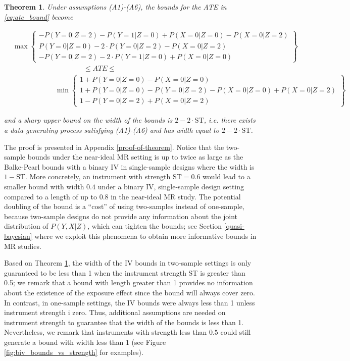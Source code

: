 \documentclass[
]{article}
\theoremstyle{plain}
\newtheorem{theorem}{Theorem}[section]
\begin{document}
\begin{theorem}\label{thm:upperBoundWidth}
Under assumptions (A1)-(A6), the bounds for the ATE in \eqref{eq:ate_bound} become

\[
  \begin{aligned}
    &\max
      \begin{Bmatrix}
        -P(Y = 0 | Z = 2) - P(Y = 1 | Z = 0) + P(X = 0 | Z = 0) - P(X = 0 | Z = 2) \\
        P(Y = 0 | Z = 0) - 2\cdot P(Y = 0 | Z = 2) - P(X = 0 | Z = 2) \\
        -P(Y = 0 | Z = 2) - 2\cdot P(Y = 1 | Z = 0) + P(X = 0 | Z = 0)
      \end{Bmatrix} \\
    &\qquad \qquad \qquad \qquad \qquad\le ATE \le \\
    &\qquad \qquad \qquad \min
      \begin{Bmatrix}
        1 + P(Y = 0 | Z = 0) - P(X = 0 | Z = 0) \\
        1 + P(Y = 0 | Z = 0) - P(Y = 0 | Z = 2) - P(X = 0 | Z = 0) + P(X = 0 | Z = 2) \\
        1 - P(Y = 0 | Z = 2) +  P(X = 0 | Z = 2)
      \end{Bmatrix}
  \end{aligned}
\]

and a sharp upper bound on the width of the bounds is $2 - 2\cdot \text{ST}$, i.e. there exists a data generating process satisfying (A1)-(A6) and has width equal to $2 - 2\cdot \text{ST}$.

\end{theorem}

The proof is presented in Appendix \ref{proof-of-theorem}. Notice that the two-sample bounds under the near-ideal MR setting is up to twice as large as the Balke-Pearl bounds with a binary IV in single-sample designs where the width is \(1-\text{ST}\). More concretely, an instrument with strength \(\text{ST} = 0.6\) would lead to a smaller bound with width \(0.4\) under a binary IV, single-sample design setting compared to a length of up to \(0.8\) in the near-ideal MR study. The potential doubling of the bound is a ``cost'' of using two-samples instead of one-sample, because two-sample designs do not provide any information about the joint distribution of \(P(Y, X | Z)\), which can tighten the bounds; see Section \ref{quasi-bayesian} where we exploit this phenomena to obtain more informative bounds in MR studies.

Based on Theorem \ref{thm:upperBoundWidth}, the width of the IV bounds in two-sample settings is only guaranteed to be less than 1 when the instrument strength ST is greater than 0.5; we remark that a bound with length greater than 1 provides no information about the existence of the exposure effect since the bound will always cover zero. In contrast, in one-sample settings, the IV bounds were always less than 1 unless instrument strength i zero. Thus, additional assumptions are needed on instrument strength to guarantee that the width of the bounds is less than 1. Nevertheless, we remark that instruments with strength less than \(0.5\) could still generate a bound with width less than \(1\) (see Figure \ref{fig:biv_bounds_vs_strength} for examples).
\end{document}
